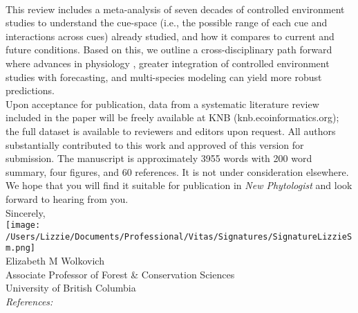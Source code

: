 \documentclass[11pt,a4paper]{article}
\begin{document}
\vspace{1.5ex}\\
This review includes a meta-analysis of seven decades of controlled environment studies to understand the cue-space (i.e., the possible range of each cue and interactions across cues) already studied, and how it compares to current and future conditions. Based on this, we outline a cross-disciplinary path forward where advances in physiology \citep[e.g.,][]{singh2019,chang2021}, greater integration of controlled environment studies with forecasting, and multi-species modeling can yield more robust predictions.
\vspace{1.5ex}\\
Upon acceptance for publication, data from a systematic literature review included in the paper will be freely available at KNB (knb.ecoinformatics.org); the full dataset is available to reviewers and editors upon request. %
All authors substantially contributed to this work and approved of this version for submission. The manuscript is approximately 3955 words with 200 word summary, four figures, and 60 references. It is not under consideration elsewhere. We hope that you will find it suitable for publication in \emph{New Phytologist} and look forward to hearing from you.
\vspace{1.5ex}\\
Sincerely,\\

\texttt{[image: /Users/Lizzie/Documents/Professional/Vitas/Signatures/SignatureLizzieSm.png]} \\

Elizabeth M Wolkovich\\
Associate Professor of Forest \& Conservation Sciences\\ 
University of British Columbia\\

\emph{References:}
\vspace{-5ex}

\end{document}
